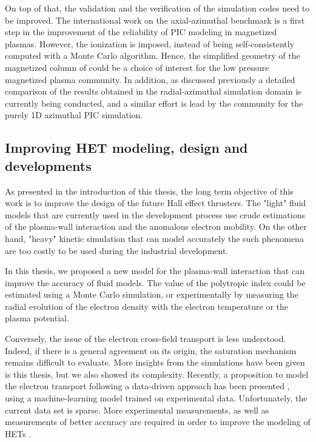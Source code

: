     On top of that, the validation and the verification of the simulation codes need to be improved.
    The international work on the axial-azimuthal benchmark \citep{charoy2019} is a first step in the improvement of the reliability of PIC modeling in magnetized plasmas.
    However, the ionization is imposed, instead of being self-consistently computed with a Monte Carlo algorithm.
    Hence, the simplified geometry of the magnetized column of \citet{lucken2019} could be a choice of interest for the low pressure magnetized plasma community.
    In addition, as discussed previously a detailed comparison of the results obtained in the radial-azimuthal simulation domain is currently being conducted, and a similar effort is lead by the community for the purely 1D azimuthal PIC simulation.
    

  \subsection{Improving HET modeling, design and developments } 

    As presented in the introduction of this thesis, the long term objective of this work is to improve the design of the future Hall effect thrusters.
    The "light" fluid models that are currently used in the development process use crude estimations of the plasma-wall interaction and the anomalous electron mobility.
    On the other hand, "heavy" kinetic simulation that can model accurately the such phenomena are too costly to be used during the industrial development.

    In this thesis, we proposed a new model for the plasma-wall interaction that can improve the accuracy of fluid models.
    The value of the polytropic index could be estimated using a Monte Carlo simulation, or experimentally by measuring the radial evolution of the electron density with the electron temperature or the plasma potential.

    Conversely, the issue of the electron cross-field transport is less understood.
    Indeed, if there is a general agreement on its origin, the saturation mechanism remains difficult to evaluate.
    More insights from the simulations have been given is this thesis, but we also showed its complexity.
    Recently, a proposition to model the electron transport following a data-driven approach has been presented \citep{jorns2018}, using a machine-learning model trained on experimental data.
    Unfortunately, the current data set is sparse.
    More experimental measurements, as well as measurements of better accuracy are required in order to improve the modeling of HETs \citep{mikellides2019}.

